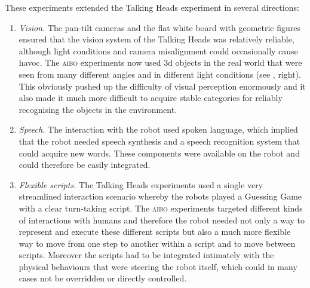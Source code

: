 These experiments extended the Talking Heads experiment in several directions: 
\begin{enumerate}
\item {\itshape Vision.} The pan-tilt cameras and the flat white board with geometric figures ensured that the vision system 
of the Talking Heads was relatively reliable, although light conditions and camera misalignment
could occasionally 
cause havoc. The \textsc{aibo} experiments now used 3d objects in the real world that were seen from many different 
angles and in different light conditions (see , right). This obviously pushed up the 
difficulty of visual perception enormously and it also made it much more difficult to acquire stable categories 
for reliably recognising the objects in the environment. 
\item {\itshape Speech.} The interaction with the robot used spoken language, which implied that the robot needed 
speech synthesis and a speech recognition system that could acquire new words. These components were available on the 
robot and could therefore be easily integrated. 
\item {\itshape Flexible scripts.} The Talking Heads experiments used a single very streamlined interaction scenario whereby
the robots played a Guessing Game with a clear turn-taking script. The \textsc{aibo} experiments targeted different 
kinds of interactions with humans and therefore the robot needed not only a way to represent and execute these 
different scripts but also a much more flexible way to move from one step to another within a script and to move 
between scripts. Moreover the scripts had to be integrated intimately with the physical behaviours that were 
steering the robot itself, which could in many cases not be overridden or directly controlled. 
\end{enumerate}


